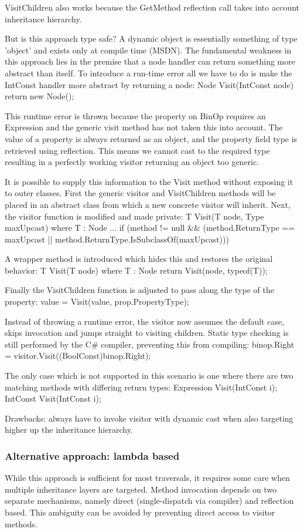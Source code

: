 \documentclass[final,a4paper,12pt]{article}
\begin{document}
VisitChildren also works because the GetMethod reflection call takes into account inheritance hierarchy.

But is this approach type safe? A dynamic object is essentially something of type 'object' and exists only at compile time (MSDN). The fundamental weakness in this approach lies in the premise that a node handler can return something more abstract than itself. To introduce a run-time error all we have to do is make the IntConst handler more abstract by returning a node:
	Node Visit(IntConst node) { return new Node(); }

This runtime error is thrown because the property on BinOp requires an Expression and the generic visit method has not taken this into account. The value of a property is always returned as an object, and the property field type is retrieved using reflection. This means we cannot cast to the required type resulting in a perfectly working visitor returning an object too generic.

It is possible to supply this information to the Visit method without exposing it to outer classes. First the generic visitor and VisitChildren methods will be placed in an abstract class from which a new concrete visitor will inherit. Next, the visitor function is modified and made private:
	T Visit(T node, Type maxUpcast) where T : Node
		...
		if (method != null \&\& (method.ReturnType == maxUpcast || method.ReturnType.IsSubclassOf(maxUpcast)))

A wrapper method is introduced which hides this and restores the original behavior:
	T Visit(T node) where T : Node
		return Visit(node, typeof(T));
		
Finally the VisitChildren function is adjusted to pass along the type of the property:
	value = Visit(value, prop.PropertyType);
	
Instead of throwing a runtime error, the visitor now assumes the default case, skips invocation and jumps straight to visiting children. Static type checking is still performed by the C\# compiler, preventing this from compiling:
	binop.Right = visitor.Visit((BoolConst)binop.Right);

The only case which is not supported in this scenario is one where there are two matching methods with differing return types:
	Expression Visit(IntConst i);
	IntConst Visit(IntConst i);

Drawbacks: always have to invoke visitor with dynamic cast when also targeting higher up the inheritance hierarchy.

\subsubsection{Alternative approach: lambda based}
While this approach is sufficient for most traversals, it requires some care when multiple inheritance layers are targeted. Method invocation depends on two separate mechanisms, namely direct (single-dispatch via compiler) and reflection based. This ambiguity can be avoided by preventing direct access to visitor methods.
\end{document}
